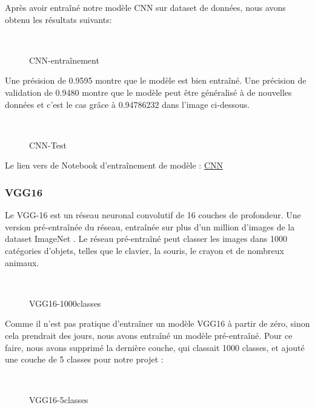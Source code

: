 {Après avoir entraîné notre modèle CNN sur dataset de données, nous avons obtenu les résultats suivants:
\begin{figure}[H] 
\centering
{}\\[0.5cm]
\caption{CNN-entraînement}
\label{fig:figure14}
\end{figure}


Une présision de 0.9595 montre que le modèle est bien entraîné.  Une précision de validation de 0.9480 montre que le modèle peut être généralisé à de nouvelles données et c'est le cas grâce à 0.94786232 dans l'image ci-dessous.

\begin{figure}[H] 
\centering
{}\\[0.5cm]
\caption{CNN-Test}
\label{fig:figure14}
\end{figure}

Le lien vers de Notebook d'entraînement de modèle : 
\href{https://github.com/mohammedAljadd/iEars/blob/main/Model%20training/Face%20identification/1-CNN%20model.ipynb}{CNN}


\subsubsection{VGG16}
Le VGG-16 est un réseau neuronal convolutif de 16 couches de profondeur. Une version pré-entraînée du réseau, entraînée sur plus d'un million d'images de la dataset ImageNet . Le réseau pré-entraîné peut classer les images dans 1000 catégories d'objets, telles que le clavier, la souris, le crayon et de nombreux animaux.\\[0.5cm]
\begin{figure}[H] 
\centering
{}\\[0.5cm]
\caption{VGG16-1000classes}
\label{fig:figure14}
\end{figure}

Comme il n'est pas pratique d'entraîner un modèle VGG16 à partir de zéro, sinon cela prendrait des jours, nous avons entraîné un modèle pré-entraîné. Pour ce faire, nous avons supprimé la dernière couche, qui classait 1000 classes, et ajouté une couche de 5 classes pour notre projet :

\begin{figure}[H] 
\centering
{}\\[0.5cm]
\caption{VGG16-5classes}
\label{fig:figure14}
\end{figure}

}
